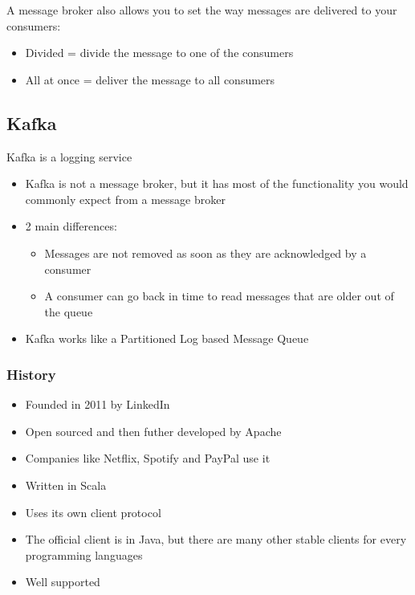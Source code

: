\documentclass{article}
\begin{document}
A message broker also allows you to set the way messages are delivered to your consumers:

\begin{itemize}
    \item Divided = divide the message to one of the consumers
    \item All at once = deliver the message to all consumers 
\end{itemize}

\subsection{Kafka}

Kafka is a logging service

\begin{itemize}
    \item Kafka is not a message broker, but it has most of the functionality you would commonly expect from a message broker
    \item 2 main differences:
    \begin{itemize}
        \item Messages are not removed as soon as they are acknowledged by a consumer
        \item A consumer can go back in time to read messages that are older out of the queue
    \end{itemize}
    \item Kafka works like a Partitioned Log based Message Queue
\end{itemize}

\subsubsection{History}

\begin{itemize}
    \item Founded in 2011 by LinkedIn
    \item Open sourced and then futher developed by Apache
    \item Companies like Netflix, Spotify and PayPal use it
    \item Written in Scala
    \item Uses its own client protocol
    \item The official client is in Java, but there are many other stable clients for every programming languages
    \item Well supported
\end{itemize}
\end{document}
